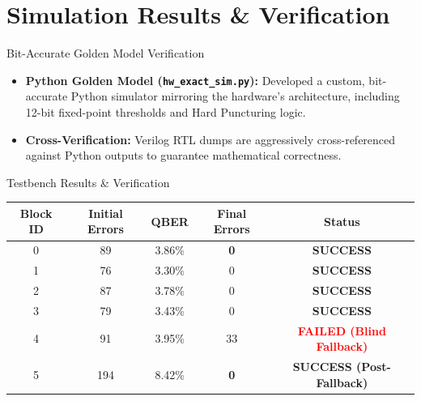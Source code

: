 \documentclass[t, aspectratio=169]{beamer}
\begin{document}
	\section{Simulation Results \& Verification}
	\useStyleHustFull
	\useThinBar 

	\begin{frame}{Bit-Accurate Golden Model Verification}
		\begin{itemize}
            \item \textbf{Python Golden Model (\texttt{hw\_exact\_sim.py}):} Developed a custom, bit-accurate Python simulator mirroring the hardware's architecture, including 12-bit fixed-point thresholds and Hard Puncturing logic.
            \item \textbf{Cross-Verification:} Verilog RTL dumps are aggressively cross-referenced against Python outputs to guarantee mathematical correctness.
        \end{itemize}
	\end{frame}

	\begin{frame}{Testbench Results \& Verification}
		\begin{table}[]
        \centering
        \renewcommand{\arraystretch}{1.2}
        \begin{tabular}{ccccc}
        \hline
        \rowcolor{blue!10} \textbf{Block ID} & \textbf{Initial Errors} & \textbf{QBER} & \textbf{Final Errors} & \textbf{Status} \\ \hline
        0 & 89 & 3.86\% & \textbf{0} & \textcolor{green!60!black}{\textbf{SUCCESS}} \\
        1 & 76 & 3.30\% & 0 & \textcolor{green!60!black}{\textbf{SUCCESS}} \\
        2 & 87 & 3.78\% & 0 & \textcolor{green!60!black}{\textbf{SUCCESS}} \\
        3 & 79 & 3.43\% & 0 & \textcolor{green!60!black}{\textbf{SUCCESS}} \\
        4 & 91 & 3.95\% & 33 & \textcolor{red}{\textbf{FAILED (Blind Fallback)}} \\
        5 & 194 & 8.42\% & \textbf{0} & \textcolor{green!60!black}{\textbf{SUCCESS (Post-Fallback)}} \\ \hline
        \end{tabular}
        \end{table}
	\end{frame}
\end{document}
